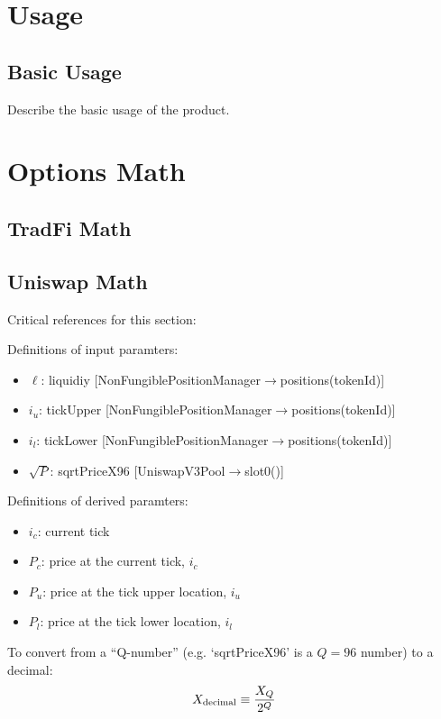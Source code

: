 \documentclass[aps,preprint]{revtex4-1}
\begin{document}
\section{Usage}
\subsection{Basic Usage}
Describe the basic usage of the product.

\section{Options Math}
\subsection{TradFi Math}
\subsection{Uniswap Math}

Critical references for this section: \cite{uniswapV3MathPrimer1,uniswapV3MathPrimer2}

Definitions of input paramters: 
\begin{itemize}
    \item $\ell$:  liquidiy [NonFungiblePositionManager$\rightarrow$positions(tokenId)]
    \item $i_u$: tickUpper [NonFungiblePositionManager$\rightarrow$positions(tokenId)]
    \item $i_l$: tickLower [NonFungiblePositionManager$\rightarrow$positions(tokenId)]
    \item $\sqrt{P}$: sqrtPriceX96 [UniswapV3Pool$\rightarrow$slot0()] 
\end{itemize}

Definitions of derived paramters: 
\begin{itemize}
    \item $i_c$: current tick 
    \item $P_c$: price at the current tick, $i_c$
    \item $P_u$: price at the tick upper location, $i_u$
    \item $P_l$: price at the tick lower location, $i_l$ 
\end{itemize}

To convert from a ``Q-number'' (e.g. `sqrtPriceX96' is a $Q=96$ number) to a decimal: 
\begin{equation}
    X_{\rm decimal} \equiv \frac{X_Q}{2^Q}
\end{equation}
\end{document}
